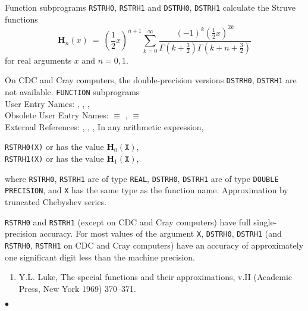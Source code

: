                               
                      
\Submitter{}                                
                     
Function subprograms {\tt RSTRH0}, {\tt RSTRH1} and
{\tt DSTRH0}, {\tt DSTRH1} calculate the Struve functions
$$ \mathbf{H}_n(x) \ = \ \textstyle(\frac{1}{2}x)^{n+1}
\displaystyle \sum_{k=0}^\infty
\frac{(-1)^k \textstyle(\frac{1}{2}x)^{2k}}
{\Gamma(k+\frac{3}{2})\Gamma(k+n+\frac{3}{2})} $$
for real arguments $x$ and $n=0,1$.
\par
On CDC and Cray computers, the double-precision versions
{\tt DSTRH0}, {\tt DSTRH1} are not available.
\Structure
{\tt FUNCTION} subprograms \\
User Entry Names:
, , ,  \\
Obsolete User Entry Names:  $\equiv$ ,
                            $\equiv$  \\
External References:
, , , 
\Usage
In any arithmetic expression,
\begin{center}
{\tt RSTRH0(X)} \quad or  \quad has the value \quad
$\mathbf{H}_0(\mathtt{X})$,\\
{\tt RSTRH1(X)} \quad or  \quad has the value \quad
$\mathbf{H}_1(\mathtt{X})$,
\end{center}
where {\tt RSTRH0}, {\tt RSTRH1} are of type {\tt REAL},
{\tt DSTRH0}, {\tt DSTRH1} are of type {\tt DOUBLE PRECISION},
and {\tt X} has the same type as the function name.
\Method
Approximation by truncated Chebyshev series.
 
\Accuracy
{\tt RSTRH0} and {\tt RSTRH1} (except on CDC and Cray computers)
have full single-precision accuracy. For most values of the argument
{\tt X}, {\tt DSTRH0}, {\tt DSTRH1} (and {\tt RSTRH0}, {\tt RSTRH1}
on CDC and Cray computers) have an accuracy
of approximately one significant digit less than the machine precision.
\Refer
\begin{enumerate}
\item Y.L. Luke, The special functions and their
approximations, v.II (Academic Press, New York 1969) 370--371.
\end{enumerate}
$\bullet$
